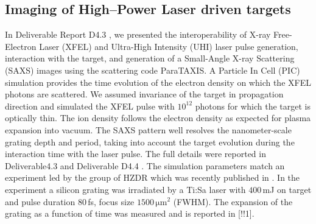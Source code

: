 \documentclass[10pt]{scrartcl}
\begin{document}
\subsection{Imaging of High--Power Laser driven targets\label{sec:high_power_imaging}}
In Deliverable Report D4.3 \cite{Fortmann-Grote2017e}, we presented the interoperability
of X-ray Free-Electron Laser (XFEL) and Ultra-High Intensity (UHI) laser pulse
generation, interaction with the target, and generation of a Small-Angle X-ray
Scattering (SAXS) images using the scattering code ParaTAXIS.  A Particle In
Cell (PIC) simulation provides the time evolution of the electron density on
which the XFEL photons are scattered.  We assumed invariance of the target in
propagation direction and simulated the XFEL pulse with $10^{12}$ photons for
which the target is optically thin.  The ion density follows the electron
density as expected for plasma expansion into vacuum.  The SAXS pattern well
resolves the nanometer-scale grating depth and period, taking into account the
target evolution during the interaction time with the laser pulse.  The full
details were reported in Deliverable4.3 \cite{Fortmann-Grote2017e} and
Deliverable D4.4 \cite{Fortmann-Grote2017h}. The simulation
parameters match an experiment led by the group of HZDR which was recently
published in \cite{Kluge2017}.  In the experiment a silicon grating was irradiated by a
Ti:Sa laser with $400$\,mJ on target and pulse duration $80$\,fs, focus size
$1500\,\mathrm{\mu m^2}$ (FWHM).  The expansion of the grating as a function of
time was measured and is reported in [!!1].
%
\end{document}
